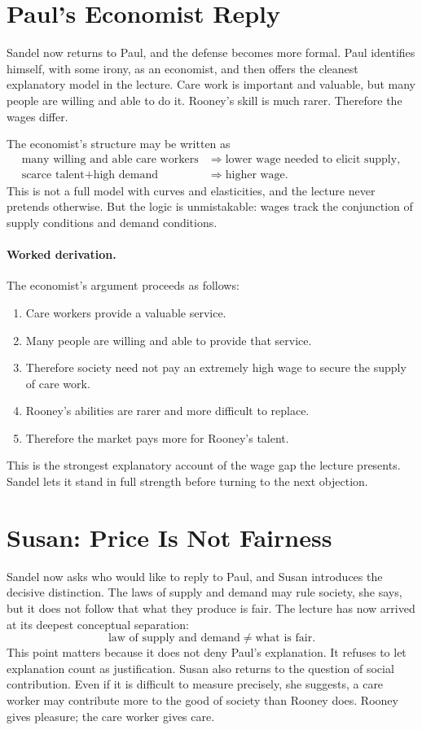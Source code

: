 \section{Paul's Economist Reply}

Sandel now returns to Paul, and the defense becomes more formal. Paul identifies himself, with some irony, as an economist, and then offers the cleanest explanatory model in the lecture. Care work is important and valuable, but many people are willing and able to do it. Rooney's skill is much rarer. Therefore the wages differ.

The economist's structure may be written as
\begin{align}
\text{many willing and able care workers}
&\Longrightarrow
\text{lower wage needed to elicit supply},\\
\text{scarce talent} + \text{high demand}
&\Longrightarrow
\text{higher wage}.
\end{align}
This is not a full model with curves and elasticities, and the lecture never pretends otherwise. But the logic is unmistakable: wages track the conjunction of supply conditions and demand conditions.

\paragraph{Worked derivation.} The economist's argument proceeds as follows:
\begin{enumerate}
\item Care workers provide a valuable service.
\item Many people are willing and able to provide that service.
\item Therefore society need not pay an extremely high wage to secure the supply of care work.
\item Rooney's abilities are rarer and more difficult to replace.
\item Therefore the market pays more for Rooney's talent.
\end{enumerate}
This is the strongest explanatory account of the wage gap the lecture presents. Sandel lets it stand in full strength before turning to the next objection.

\section{Susan: Price Is Not Fairness}

Sandel now asks who would like to reply to Paul, and Susan introduces the decisive distinction. The laws of supply and demand may rule society, she says, but it does not follow that what they produce is fair. The lecture has now arrived at its deepest conceptual separation:
\begin{equation}
\text{law of supply and demand}
\neq
\text{what is fair}.
\end{equation}
This point matters because it does not deny Paul's explanation. It refuses to let explanation count as justification. Susan also returns to the question of social contribution. Even if it is difficult to measure precisely, she suggests, a care worker may contribute more to the good of society than Rooney does. Rooney gives pleasure; the care worker gives care.

